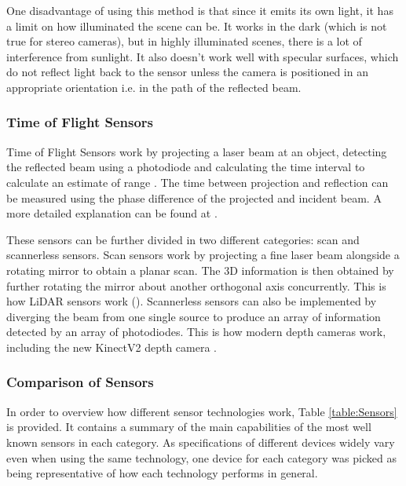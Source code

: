 \documentclass[11pt]{article}
\begin{document}
One disadvantage of using this method is that since it emits its own light, it has a limit on how illuminated the scene can be. It works in the dark (which is not true for stereo cameras), but in highly illuminated scenes, there is a lot of interference from sunlight. It also doesn't work well with specular surfaces, which do not reflect light back to the sensor unless the camera is positioned in an appropriate orientation i.e. in the path of the reflected beam.
	
	\subsubsection{Time of Flight Sensors}

Time of Flight Sensors work by projecting a laser beam at an object, detecting the reflected beam using a photodiode and calculating the time interval to calculate an estimate of range \cite{horaud2016overview}. The time between projection and reflection can be measured using the phase difference of the projected and incident beam. A more detailed explanation can be found at \cite{horaud2016overview}.

These sensors can be further divided in two different categories: scan and scannerless sensors. Scan sensors work by projecting a fine laser beam alongside a rotating mirror to obtain a planar scan. The 3D information is then obtained by further rotating the mirror about another orthogonal axis concurrently. This is how LiDAR sensors work (\cite{horaud2016overview}). Scannerless sensors can also be implemented by diverging the beam from one single source to produce an array of information detected by an array of photodiodes. This is how modern depth cameras work, including the new KinectV2 depth camera \cite{wasenmuller2016comparison}.

	\subsubsection{Comparison of Sensors}

In order to overview how different sensor technologies work, Table \ref{table:Sensors} is provided. It contains a summary of the main capabilities of the most well known sensors in each category. As specifications of different devices widely vary even when using the same technology, one device for each category was picked as being representative of how each technology performs in general.
\end{document}
